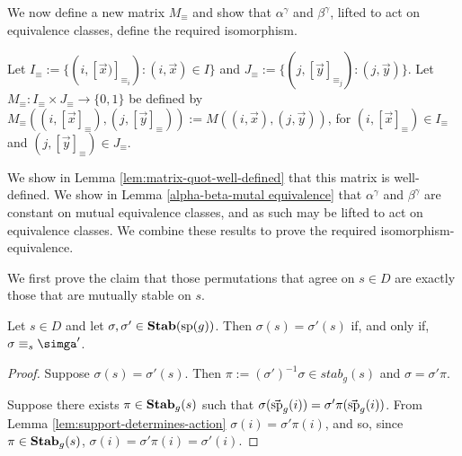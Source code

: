 \documentclass[../paper.tex]{subfiles}
\begin{document}

We now define a new matrix $M_{\equiv}$ and show that $\alpha^{\gamma}$ and
$\beta^{\gamma}$, lifted to act on equivalence classes, define the required
isomorphism.

Let $I_{\equiv} := \{(i, [\vec{x})]_{\equiv_i}) : (i, \vec{x}) \in I\}$ and
$J_\equiv := \{(j, [\vec{y}]_{\equiv_j}) : (j, \vec{y})\}$. Let $M_{\equiv} :
I_{\equiv} \times J_{\equiv} \rightarrow \{0,1\}$ be defined by $M_\equiv ((i,
[\vec{x}]_\equiv), (j, [\vec{y}]_\equiv)) := M((i,\vec{x}), (j, \vec{y}))$, for
$(i, [\vec{x}]_{\equiv}) \in I_\equiv$ and $(j, [\vec{y}]_{\equiv}) \in
J_\equiv$.

We show in Lemma \ref{lem:matrix-quot-well-defined} that this matrix is
well-defined. We show in Lemma \ref{alpha-beta-mutal equivalence} that
$\alpha^{\gamma}$ and $\beta^{\gamma}$ are constant on mutual equivalence
classes, and as such may be lifted to act on equivalence classes. We combine
these results to prove the required isomorphism-equivalence.

We first prove the claim that those permutations that agree on $s \in D$ are
exactly those that are mutually stable on $s$.

\begin{lem}
  Let $s \in D$ and let $\sigma, \sigma' \in \text{\textbf{Stab}}(\text{sp}(g))$. Then $\sigma(s)
  = \sigma' (s)$ if, and only if, $\sigma \equiv_s \simga'$.
  \label{lem:functions-mutual-equivalence}
\end{lem}
\begin{proof}
  Suppose $\sigma(s) = \sigma'(s)$. Then $\pi := (\sigma')^{-1}\sigma \in
  stab_g(s)$ and $\sigma = \sigma' \pi$.

  Suppose there exists $\pi \in \text{\textbf{Stab}}_g(s)$ such that $\sigma
  (\vec{\text{sp}}_g(i))= \sigma' \pi (\vec{\text{sp}}_g(i))$. From Lemma
  \ref{lem:support-determines-action} $\sigma (i) = \sigma' \pi (i)$, and so,
  since $\pi \in \text{\textbf{Stab}}_g(s)$, $\sigma(i) = \sigma' \pi (i) = \sigma' (i)$.
\end{proof}
\end{document}
